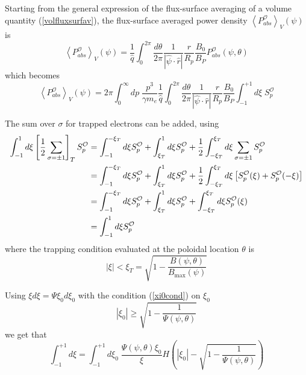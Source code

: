 Starting from the general expression of the flux-surface averaging of a
volume quantity (\ref{volfluxsurfav}), the flux-surface averaged power
density $\left\langle P_{abs}^{\mathcal{O}}\right\rangle _{V}\left(
\psi\right) $ is
\begin{equation}
\left\langle P_{abs}^{\mathcal{O}}\right\rangle _{V}\left( \psi\right) =%
\frac{1}{\widehat{q}}\int_{0}^{2\pi}\frac{d\theta}{2\pi}\frac{1}{\left|
\widehat{\psi}\cdot\widehat{r}\right| }\frac{r}{R_{p}}\frac{B_{0}}{B_{P}}
P_{abs}^{\mathcal{O}}\left( \psi,\theta\right)
\end{equation}
which becomes
\begin{equation}
\left\langle P_{abs}^{\mathcal{O}}\right\rangle _{V}\left( \psi\right)
=2\pi\int_{0}^{\infty}dp\;\frac{p^{3}}{\gamma m_{e}}\frac{1}{\widehat{q}}
\int_{0}^{2\pi}\frac{d\theta}{2\pi}\frac{1}{\left| \widehat{\psi}\cdot%
\widehat{r}\right| }\frac{r}{R_{p}}\frac{B_{0}}{B_{P}}\int_{-1}^{+1}d\xi%
\;S_{p}^{\mathcal{O}}
\end{equation}

The sum over $\sigma$ for trapped electrons can be added, using
\begin{align}
\int_{-1}^{1}d\xi\left[ \frac{1}{2}\sum_{\sigma=\pm1}\right] _{T}S_{p}^{%
\mathcal{O}} & =\int_{-1}^{-\xi_{T}}d\xi S_{p}^{\mathcal{O}}+\int
_{\xi_{T}}^{1}d\xi S_{p}^{\mathcal{O}}+\frac{1}{2}\int_{-\xi_{T}}^{\xi_{T}}d%
\xi\sum_{\sigma=\pm1}S_{p}^{\mathcal{O}}  \nonumber \\
& =\int_{-1}^{-\xi_{T}}d\xi S_{p}^{\mathcal{O}}+\int_{\xi_{T}}^{1}d\xi
S_{p}^{\mathcal{O}}+\frac{1}{2}\int_{-\xi_{T}}^{\xi_{T}}d\xi\left[ S_{p}^{%
\mathcal{O}}(\xi)+S_{p}^{\mathcal{O}}(-\xi)\right]  \nonumber \\
& =\int_{-1}^{-\xi_{T}}d\xi S_{p}^{\mathcal{O}}+\int_{\xi_{T}}^{1}d\xi
S_{p}^{\mathcal{O}}+\int_{-\xi_{T}}^{\xi_{T}}d\xi S_{p}^{\mathcal{O}}(\xi)
\nonumber \\
& =\int_{-1}^{1}d\xi S_{p}^{\mathcal{O}}
\end{align}
where the trapping condition evaluated at the poloidal location $\theta$ is
\begin{equation}
\left| \xi\right| <\xi_{T}=\sqrt{1-\frac{B\left( \psi,\theta\right) }{
B_{\max}\left( \psi\right) }}
\end{equation}

Using $\xi d\xi=\Psi\xi_{0}d\xi_{0}$ with the condition (\ref{xi0cond}) on $%
\xi_{0}$%
\begin{equation}
\left| \xi_{0}\right| \geq\sqrt{1-\frac{1}{\Psi\left( \psi,\theta\right) }}
\label{xi0cond3}
\end{equation}
we get that
\begin{equation}
\int_{-1}^{+1}d\xi=\int_{-1}^{+1}d\xi_{0}\;\frac{\Psi\left( \psi
,\theta\right) \xi_{0}}{\xi}H\left( \left| \xi_{0}\right| -\sqrt {1-\frac{1}{
\Psi\left( \psi,\theta\right) }}\right)
\end{equation}

